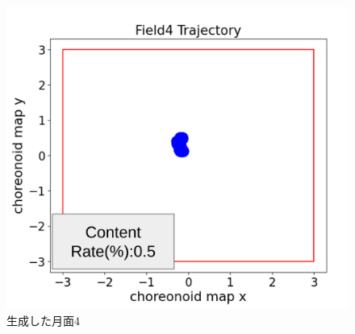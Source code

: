  \begin{figure}[htbp]
  \begin{center}
   \includegraphics[width=0.6\linewidth]{images/generate_trajectory4.png}
   \caption{生成した月面4}
   \label{fig:generate_trajectory4}
  \end{center}
 \end{figure}

